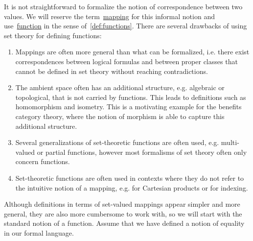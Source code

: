 It is not straightforward to formalize the notion of correspondence between two values. We will reserve the term~\uline{mapping} for this informal notion and use~\uline{function} in the sense of~\cref{def:functions}. There are several drawbacks of using set theory for defining functions:
\begin{enumerate}
  \item Mappings are often more general than what can be formalized, i.e. there exist correspondences between logical formulas and between proper classes that cannot be defined in set theory without reaching contradictions.
  \item The ambient space often has an additional structure, e.g. algebraic or topological, that is not carried by functions. This leads to definitions such as homomorphism and isometry. This is a motivating example for the benefits category theory, where the notion of morphism is able to capture this additional structure.
  \item Several generalizations of set-theoretic functions are often used, e.g. multi-valued or partial functions, however most formalisms of set theory often only concern functions.
  \item Set-theoretic functions are often used in contexts where they do not refer to the intuitive notion of a mapping, e.g. for Cartesian products or for indexing.
\end{enumerate}

Although definitions in terms of set-valued mappings appear simpler and more general, they are also more cumbersome to work with, so we will start with the standard notion of a function. Assume that we have defined a notion of equality in our formal language.

